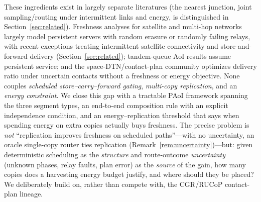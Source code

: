\documentclass[twocolumn,3p,times,procedia]{elsarticle}
\begin{document}
These ingredients exist in largely separate literatures (the nearest
junction, joint sampling/routing under intermittent links and energy, is
distinguished in Section~\ref{sec:related}).
Freshness analyses for satellite and multi-hop networks largely model
persistent servers with random erasure or randomly failing relays,
with recent exceptions treating intermittent satellite connectivity
and store-and-forward delivery (Section~\ref{sec:related});
tandem-queue AoI
results assume persistent service; and the space-DTN/contact-plan
community optimizes delivery ratio under uncertain contacts without a
freshness or energy objective. None couples \emph{scheduled
store--carry--forward gating}, \emph{multi-copy replication}, and an
\emph{energy constraint}. We close this gap with a tractable PAoI
framework spanning the three segment types, an end-to-end composition
rule with an explicit independence condition, and an energy--replication
threshold that says when spending energy on extra copies actually buys
freshness. The precise problem is \emph{not} ``replication improves
freshness on scheduled paths''---with no uncertainty, an oracle
single-copy router ties replication
(Remark~\ref{rem:uncertainty})---but: given deterministic scheduling as
the \emph{structure} and route-outcome \emph{uncertainty} (unknown
phases, relay faults, plan error) as the \emph{source} of the gain,
how many copies does a harvesting energy budget justify, and where
should they be placed? We deliberately build on, rather than
compete with, the CGR/RUCoP contact-plan lineage.
\end{document}
